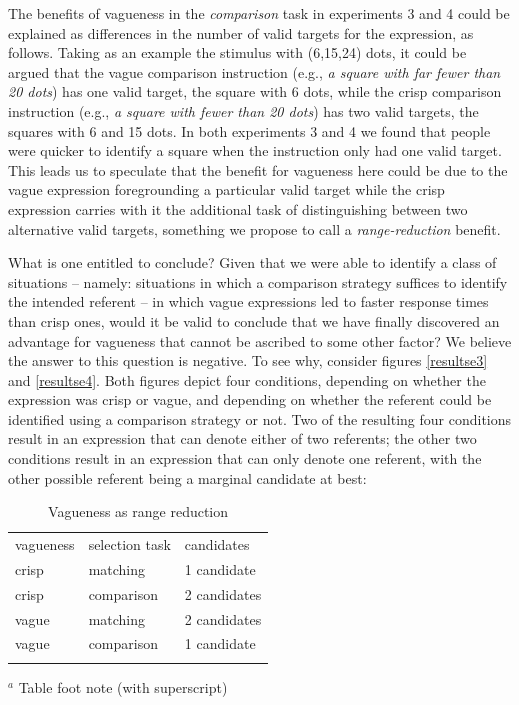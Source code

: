 \documentclass[graybox,envcountchap,sectrefs%
,footinfo
]{svmono}
\begin{document}
The benefits of vagueness in the \emph{comparison} task in experiments 3 and 4 could be explained as differences in the number of valid targets for the expression, as follows. Taking as an example the stimulus with (6,15,24) dots, it could be argued that the vague comparison instruction (e.g., \emph{a square with far fewer than 20 dots}) has one valid target, the square with 6 dots, while the crisp comparison instruction (e.g., \emph{a square with fewer than 20 dots}) has two valid targets, the squares with 6 and 15 dots. In both experiments 3 and 4 we found that people were quicker to identify a square when the instruction only had one valid target. This leads us to speculate that the benefit for vagueness here could be due to the vague expression foregrounding a particular valid target while the crisp expression carries with it the additional task of distinguishing between two alternative valid targets, something we propose to call a \emph{range-reduction} benefit.

What is one entitled to conclude? Given that we were able to identify a class of situations -- namely: situations in which a comparison strategy suffices to identify the intended referent -- in which vague expressions led to faster response times than crisp ones, would it be valid to conclude that we have finally discovered an advantage for vagueness that cannot be ascribed to some other factor? We believe the answer to this question is negative. To see why, consider figures \ref{resultse3} and \ref{resultse4}. Both figures depict four conditions, depending on whether the expression was crisp or vague, and depending on whether the referent could be identified using a comparison strategy or not. Two of the resulting four conditions result in an expression that can denote either of two referents; the other two conditions result in an expression that can only denote one referent, with the other possible referent being a marginal candidate at best:

\begin{table}
\caption{Vagueness as range reduction}
\label{vaguenessasrangereduction} 
\begin{tabular}{lll}
\hline\noalign{\smallskip}
vagueness & selection task & candidates\\
\noalign{\smallskip}\svhline\noalign{\smallskip}
crisp 	& matching 	& 1 candidate\\
crisp 	& comparison 	& 2 candidates\\
vague 	& matching 	& 2 candidates\\
vague 	& comparison 	& 1 candidate\\
\noalign{\smallskip}\hline\noalign{\smallskip}
\end{tabular}
$^a$ Table foot note (with superscript)\\
\end{table}
\end{document}
